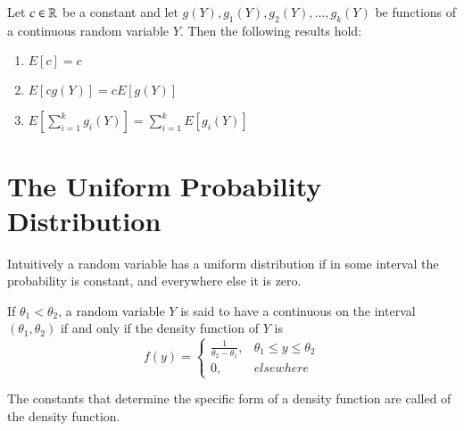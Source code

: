 \documentclass[12pt, a4paper, twoside, openright, titlepage]{book}
\begin{document}
\begin{thm}{}{}
    Let $c \in \mathbb R$ be a constant and let $g(Y), g_1(Y),g_2(Y),...,g_k(Y)$ be functions of a continuous random variable $Y$. Then the following results hold: \begin{enumerate}
        \item $E[c] = c$
        \item $E[cg(Y)] = cE[g(Y)]$
        \item $E\left[\sum\limits_{i=1}^kg_i(Y)\right] = \sum\limits_{i=1}^kE[g_i(Y)]$
    \end{enumerate}
\end{thm}


\section{\textsection The Uniform Probability Distribution}

Intuitively a random variable has a uniform distribution if in some interval the probability is constant, and everywhere else it is zero.

\begin{defn}{}{}
    If $\theta_1<\theta_2$, a random variable $Y$ is said to have a continuous  on the interval $(\theta_1,\theta_2)$ if and only if the density function of $Y$ is \begin{equation*}
        f(y) = \left\{\begin{array}{lc} \frac{1}{\theta_2-\theta_1}, & \theta_1\leq y \leq \theta_2 \\ 0, & elsewhere \end{array}\right.
    \end{equation*}
\end{defn}


\begin{defn}{}{}
    The constants that determine the specific form of a density function are called  of the density function.
\end{defn}
\end{document}
